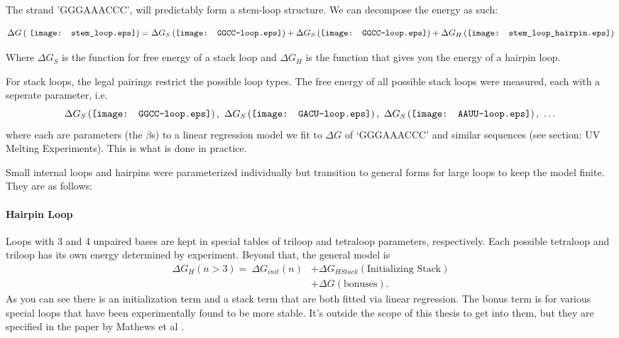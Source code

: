 The strand 'GGGAAACCC', will predictably form a stem-loop
structure. We can decompose the energy as such:

\begin{equation}
\Delta G \left ( \vcenter{\hbox{ \texttt{[image: stem\_loop.eps]}}}
 \right ) =
\Delta G_S \left ( \vcenter{\hbox{\texttt{[image: GGCC-loop.eps]}}}
\right ) +
\Delta G_S \left ( \vcenter{\hbox{\texttt{[image: GGCC-loop.eps]}}}
\right ) + 
\Delta G_H \left (\vcenter{\hbox{\texttt{[image: stem\_loop\_hairpin.eps]}}}
\right )
\label{eq:decomposition}
\end{equation}

Where $\Delta G_S$ is the function for free energy of a stack loop and
$\Delta G_H$ is the function that gives you the energy of a hairpin
loop.

For stack loops, the legal pairings restrict the possible loop
types. The free energy of all possible stack loops were measured, each
with a seperate parameter, i.e.
\begin{equation}
\Delta G_S \left ( \vcenter{\hbox{\texttt{[image: GGCC-loop.eps]}}}
\right ), \  
\Delta G_S \left ( \vcenter{\hbox{\texttt{[image: GACU-loop.eps]}}}
\right ), \ 
\Delta G_S \left ( \vcenter{\hbox{\texttt{[image: AAUU-loop.eps]}}}
\right ), \ \dots
\end{equation}
where each are parameters (the $\beta$s) to a linear regression model
we fit to $\Delta G$ of `GGGAAACCC' and similar sequences (see
section: UV Melting Experiments). This is what is done in practice.

Small internal loops and hairpins were parameterized individually but
transition to general forms for large loops to keep the model
finite. They are as follows:

\paragraph{Hairpin Loop} 
Loops with 3 and 4 unpaired bases are kept in special tables of
triloop and tetraloop parameters, respectively. Each possible
tetraloop and triloop has its own energy determined by
experiment. Beyond that, the general model is 
\begin{equation}
\begin{split}
\Delta G_H(n > 3) =  \  \Delta G_{init}(n) &+ \Delta
G_{HStack} (\text{Initializing Stack}) \\
&+ \Delta G (\text{bonuses}).
\end{split}
\end{equation}
As you can see there is an initialization term and a stack term that
are both fitted via linear regression. The bonus term is for various
special loops that have been experimentally found to be more
stable. It's outside the scope of this thesis to get into them, but
they are specified in the paper by Mathews et al \cite{mathews1999expanded}.

